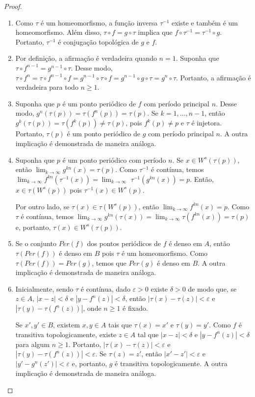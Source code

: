\begin{proof}
\begin{enumerate}
\item Como $\tau$ é um homeomorfismo, a função inversa $\tau^{-1}$ existe e também é um homeomorfismo. Além disso, $\tau \circ f = g \circ \tau$ implica que $f \circ \tau^{-1} = \tau^{-1} \circ g$. Portanto, $\tau^{-1}$ é conjugação topológica de $g$ e $f$.
\item Por definição, a afirmação é verdadeira quando $n = 1$. Suponha que $\tau \circ f^{n-1} = g^{n-1} \circ \tau$. Desse modo, $\tau \circ f^n = \tau \circ f^{n-1} \circ f = g^{n-1} \circ \tau \circ f = g^{n-1} \circ g \circ  \tau = g^n \circ \tau$. Portanto, a afirmação é verdadeira para todo $n \geq 1$.
\item Suponha que $p$ é um ponto periódico de $f$ com período principal $n$. Desse modo, $g^n(\tau(p)) = \tau(f^n(p)) = \tau(p)$. Se $k = 1, \dots, n-1$, então $g^k(\tau(p)) = \tau(f^k(p)) \neq \tau(p)$, pois $f^k(p) \neq p$ e $\tau$ é injetora. Portanto, $\tau(p)$ é um ponto periódico de $g$ com período principal $n$. A outra implicação é demonstrada de maneira análoga.
\item Suponha que $p$ é um ponto periódico com período $n$. Se $x \in W^s(\tau(p))$, então $\lim_{k \to \infty} g^{kn}(x) = \tau(p)$. Como $\tau^{-1}$ é contínua, temos $\lim_{k \to \infty} f^{kn}(\tau^{-1}(x)) = \lim_{k \to \infty} $ $ \tau^{-1}(g^{kn}(x))= p$. Então,  $x \in \tau(W^s(p))$ pois $\tau^{-1}(x) \in W^s(p)$.

Por outro lado, se $\tau(x) \in \tau(W^s(p))$, então $\lim_{k \to \infty} f^{kn}(x) = p$. Como $\tau$ é contínua, temos $\lim_{k \to \infty} g^{kn}(\tau(x)) = \lim_{k \to \infty} \tau(f^{kn}(x)) = \tau(p)$ e, portanto, $\tau(x) \in W^s(\tau(p))$.
\item Se o conjunto $Per(f)$ dos pontos periódicos de $f$ é denso em $A$, então $\tau(Per(f))$ é denso em $B$ pois $\tau$ é um homeomorfismo. Como $\tau(Per(f)) = Per(g)$, temos que $Per(g)$ é denso em $B$. A outra implicação é demonstrada de maneira análoga.
\item Inicialmente, sendo $\tau$ é contínua, dado $\varepsilon > 0$ existe $\delta > 0$ de modo que, se $z \in A$, $|x - z| < \delta$ e $|y - f^n(z)| < \delta$, então $|\tau(x) - \tau(z)| < \varepsilon$ e $|\tau(y) - \tau(f^n(z))|$, onde $n \geq 1$ é fixado.

Se $x', y' \in B$, existem $x, y \in A$ tais que $\tau(x) = x'$ e $\tau(y) =  y'$. Como $f$ é transitiva topologicamente, existe $z \in A$ tal que $|x - z| < \delta$ e $|y - f^n(z)| < \delta$ para algum $n \geq 1$. Portanto, $|\tau(x) - \tau(z)| < \varepsilon$ e $|\tau(y) - \tau(f^n(z))| < \varepsilon$. Se $\tau(z) = z'$, então $|x' - z'| < \varepsilon$ e $|y' - g^n(z')| < \varepsilon$ e, portanto, $g$ é transitiva topologicamente. A outra implicação é demonstrada de maneira análoga.
\end{enumerate}
\end{proof}

